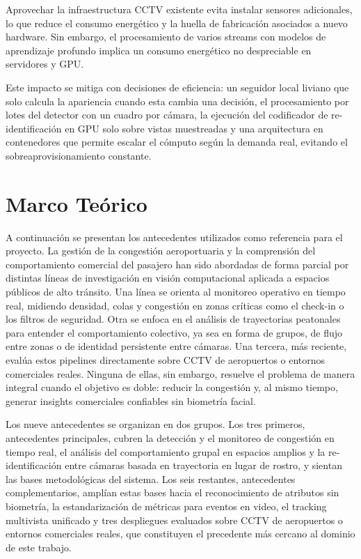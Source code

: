 \documentclass[12pt,letterpaper]{article}
\begin{document}
Aprovechar la infraestructura CCTV existente evita instalar sensores
adicionales, lo que reduce el consumo energético y la huella de
fabricación asociados a nuevo hardware. Sin embargo, el procesamiento de
varios streams con modelos de aprendizaje profundo implica un consumo
energético no despreciable en servidores y GPU.

Este impacto se mitiga con decisiones de eficiencia: un seguidor local
liviano que solo calcula la apariencia cuando esta cambia una decisión,
el procesamiento por lotes del detector con un cuadro por cámara, la
ejecución del codificador de re-identificación en GPU solo sobre vistas
muestreadas y una arquitectura en contenedores que permite escalar el
cómputo según la demanda real, evitando el sobreaprovisionamiento
constante.


\section{Marco Teórico}
\label{sec:related}

A continuación se presentan los antecedentes utilizados como referencia
para el proyecto. La gestión de la congestión aeroportuaria y la
comprensión del comportamiento comercial del pasajero han sido abordadas
de forma parcial por distintas líneas de investigación en visión
computacional aplicada a espacios públicos de alto tránsito. Una línea se
orienta al monitoreo operativo en tiempo real, midiendo densidad, colas y
congestión en zonas críticas como el check-in o los filtros de
seguridad. Otra se enfoca en el análisis de trayectorias peatonales para
entender el comportamiento colectivo, ya sea en forma de grupos, de flujo
entre zonas o de identidad persistente entre cámaras. Una tercera, más
reciente, evalúa estos pipelines directamente sobre CCTV de aeropuertos
o entornos comerciales reales. Ninguna de ellas, sin embargo, resuelve el
problema de manera integral cuando el objetivo es doble: reducir la
congestión y, al mismo tiempo, generar insights comerciales confiables
sin biometría facial.

Los nueve antecedentes se organizan en dos grupos. Los tres primeros,
antecedentes principales, cubren la detección y el monitoreo de
congestión en tiempo real, el análisis del comportamiento grupal en
espacios amplios y la re-identificación entre cámaras basada en
trayectoria en lugar de rostro, y sientan las bases metodológicas del
sistema. Los seis restantes, antecedentes complementarios, amplían estas
bases hacia el reconocimiento de atributos sin biometría, la
estandarización de métricas para eventos en video, el tracking multivista
unificado y tres despliegues evaluados sobre CCTV de aeropuertos o
entornos comerciales reales, que constituyen el precedente más cercano al
dominio de este trabajo.
\end{document}
